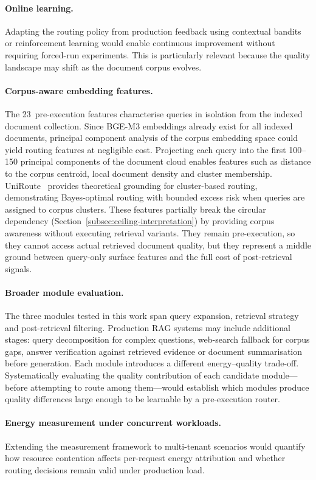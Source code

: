 \paragraph{Online learning.} Adapting the routing policy from production feedback using contextual
bandits or reinforcement learning would enable continuous improvement
without requiring forced-run experiments.  This is particularly relevant
because the quality landscape may shift as the document corpus evolves.

\paragraph{Corpus-aware embedding features.}
The 23~pre-execution features characterise queries in isolation from the
indexed document collection.  Since BGE-M3 embeddings already exist for
all indexed documents, principal component analysis of the corpus
embedding space could yield routing features at negligible cost.
Projecting each query into the first 100--150 principal components of the
document cloud enables features such as distance to the corpus centroid,
local document density and cluster membership.  UniRoute~\cite{uniroute2025}
provides theoretical grounding for cluster-based routing, demonstrating
Bayes-optimal routing with bounded excess risk when queries are assigned
to corpus clusters.  These features partially break the circular
dependency (Section~\ref{subsec:ceiling-interpretation}) by providing
corpus awareness without executing retrieval variants.  They remain
pre-execution, so they cannot access actual retrieved document quality,
but they represent a middle ground between query-only surface features
and the full cost of post-retrieval signals.

\paragraph{Broader module evaluation.}
The three modules tested in this work span query expansion, retrieval
strategy and post-retrieval filtering.  Production RAG systems may
include additional stages: query decomposition for complex questions,
web-search fallback for corpus gaps, answer verification against retrieved
evidence or document summarisation before generation.  Each module
introduces a different energy--quality trade-off.  Systematically
evaluating the quality contribution of each candidate module---before
attempting to route among them---would establish which modules produce
quality differences large enough to be learnable by a pre-execution
router.

\paragraph{Energy measurement under concurrent workloads.}
Extending the measurement framework to multi-tenant scenarios would
quantify how resource contention affects per-request energy attribution
and whether routing decisions remain valid under production load.
